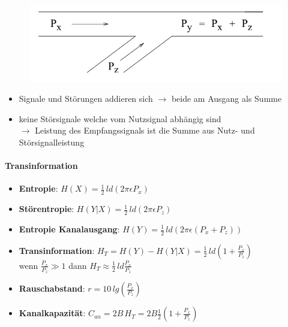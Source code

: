 \documentclass[12pt,a4paper]{article}
\begin{document}
\begin{figure}[H]
\includegraphics[scale=0.5]{./resources/ana_mod.png}
\end{figure}
\begin{itemize}
\item Signale und Störungen addieren sich $\rightarrow$ beide am Ausgang als Summe
\item keine Störsignale welche vom Nutzsignal abhängig sind\\
$\rightarrow$ Leistung des Empfangssignals ist die Summe aus Nutz- und Störsignalleistung
\end{itemize}

\paragraph{Transinformation\\}
\begin{itemize}
\item \textbf{Entropie}: $H(X) = \frac{1}{2} \, ld(2\pi \epsilon P_x)$
\item \textbf{Störentropie}: $H(Y\vert X) = \frac{1}{2} \, ld(2\pi \epsilon P_z)$
\item \textbf{Entropie Kanalausgang}: $H(Y) = \frac{1}{2} \, ld(2\pi \epsilon (P_x + P_z))$
\item \textbf{Transinformation}: $H_T = H(Y) - H(Y\vert X) = \frac{1}{2} \, ld(1 + \frac{P_x}{P_z})$ \\
wenn $\frac{P_x}{P_z} \gg 1$ dann $H_T \approx \frac{1}{2} \, ld \frac{P_x}{P_z}$
\item \textbf{Rauschabstand}: $r = 10 \, lg(\frac{P_x}{P_z})$
\item \textbf{Kanalkapazität}: $C_{an} = 2B\, H_T = 2B\frac{1}{2}(1+\frac{P_x}{P_z})$
\end{itemize}
\end{document}
